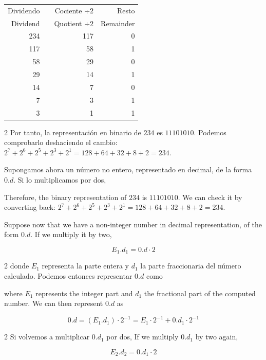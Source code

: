 \begin{table}[h]
	\centering
\begin{tabular}{|r|r|r|r|}
Dividendo& &Cociente $\div 2$&Resto\\
Dividend& &Quotient $\div 2$&Remainder\\
\hline
234& &117&0\\
117& &58&1\\
58& &29&0\\
29& &14&1\\
14& &7&0\\
7& &3&1\\
3& &1&1
\end{tabular}
\end{table}
 \begin{paracol}{2}
 Por tanto, la representación en binario de $234$ es $11101010$. Podemos comprobarlo deshaciendo el cambio: $2^7+2^6+2^5+2^3+2^1=128+64+32+8+2=234$.

Supongamos ahora un número no entero, representado en decimal, de la forma $0.d$. Si lo multiplicamos por dos,

\switchcolumn

Therefore, the binary representation of $234$ is $11101010$. We can check it by converting back: $2^7+2^6+2^5+2^3+2^1=128+64+32+8+2=234$.

 Suppose now that we have a non-integer number in decimal representation, of the form $0.d$. If we multiply it by two,
\end{paracol}


\begin{equation}
E_1.d_1=0.d\cdot 2
\end{equation}
\begin{paracol}{2}
donde $E_1$ representa la parte entera y $d_1$ la parte fraccionaria del número calculado.
Podemos entonces representar $0.d$ como

\switchcolumn

where $E_1$ represents the integer part and $d_1$ the fractional part of the computed number. We can then represent $0.d$ as
\end{paracol}
\begin{equation}
\label{eq:intro_frac}
0.d=(E_1.d_1)\cdot 2^{-1}=E_1\cdot 2^{-1}+0.d_1\cdot 2^{-1}
\end{equation}
\begin{paracol}{2}
Si volvemos a multiplicar $0.d_1$ por dos,
\switchcolumn
If we multiply $0.d_1$ by two again,
\end{paracol}
\begin{equation}
E_2.d_2 = 0.d_1\cdot 2
\end{equation}

